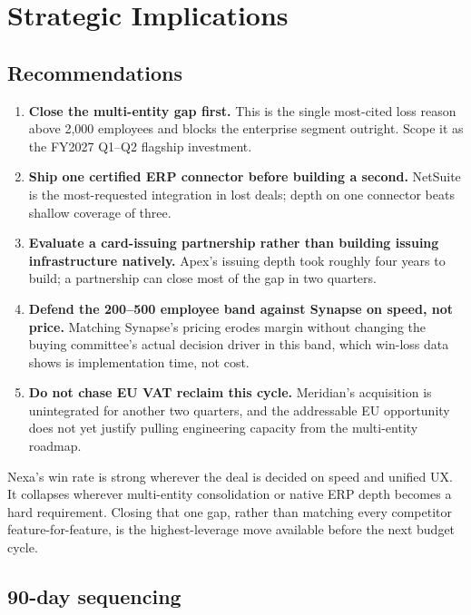 \section{Strategic Implications}

\subsection{Recommendations}

\begin{enumerate}[leftmargin=1.4em, itemsep=3pt]
  \item \textbf{Close the multi-entity gap first.} This is the single most-cited loss reason
    above 2,000 employees and blocks the enterprise segment outright. Scope it as the FY2027
    Q1--Q2 flagship investment.
  \item \textbf{Ship one certified ERP connector before building a second.} NetSuite is the
    most-requested integration in lost deals; depth on one connector beats shallow coverage of
    three.
  \item \textbf{Evaluate a card-issuing partnership rather than building issuing
    infrastructure natively.} Apex's issuing depth took roughly four years to build; a
    partnership can close most of the gap in two quarters.
  \item \textbf{Defend the 200--500 employee band against Synapse on speed, not price.} Matching
    Synapse's pricing erodes margin without changing the buying committee's actual decision
    driver in this band, which win-loss data shows is implementation time, not cost.
  \item \textbf{Do not chase EU VAT reclaim this cycle.} Meridian's acquisition is unintegrated
    for another two quarters, and the addressable EU opportunity does not yet justify pulling
    engineering capacity from the multi-entity roadmap.
\end{enumerate}

\begin{tcolorbox}[keybox, title={\faFlag\ Bottom line}]
Nexa's win rate is strong wherever the deal is decided on speed and unified UX. It collapses
wherever multi-entity consolidation or native ERP depth becomes a hard requirement. Closing
that one gap, rather than matching every competitor feature-for-feature, is the highest-leverage
move available before the next budget cycle.
\end{tcolorbox}

\subsection{90-day sequencing}

